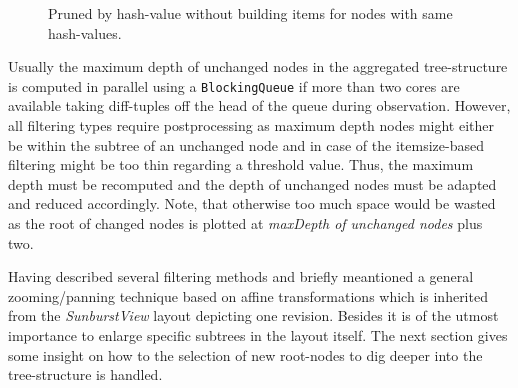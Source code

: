 \begin{itemize}
\begin{figure}[tb]
\caption{\label{fig:pruned-by-hash-without-samehashes} Pruned by hash-value without building items for nodes with same hash-values.}
\end{figure}
\end{itemize}

Usually the maximum depth of unchanged nodes in the aggregated tree-structure is computed in parallel using a \texttt{BlockingQueue} if more than two cores are available taking diff-tuples off the head of the queue during observation. However, all filtering types require postprocessing as maximum depth nodes might either be within the subtree of an unchanged node and in case of the itemsize-based filtering might be too thin regarding a threshold value. Thus, the maximum depth must be recomputed and the depth of unchanged nodes must be adapted and reduced accordingly. Note, that otherwise too much space would be wasted as the root of changed nodes is plotted at \emph{maxDepth of unchanged nodes} plus two.

Having described several filtering methods and briefly meantioned a general zooming/panning technique based on affine transformations which is inherited from the \emph{SunburstView} layout depicting one revision. Besides it is of the utmost importance to enlarge specific subtrees in the layout itself. The next section gives some insight on how to the selection of new root-nodes to dig deeper into the tree-structure is handled.

